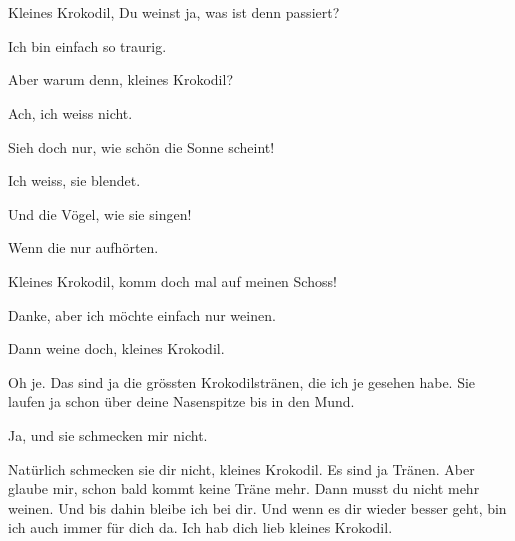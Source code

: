 \chapter*{}

Kleines Krokodil, Du weinst ja, was ist denn passiert?

Ich bin einfach so traurig.

Aber warum denn, kleines Krokodil?

Ach, ich weiss nicht.

Sieh doch nur, wie schön die Sonne scheint!

Ich weiss, sie blendet.

Und die Vögel, wie sie singen!

Wenn die nur aufhörten.

Kleines Krokodil, komm doch mal auf meinen Schoss!

Danke, aber ich möchte einfach nur weinen.

Dann weine doch, kleines Krokodil.



Oh je. Das sind ja die grössten Krokodilstränen, die ich je gesehen habe. Sie laufen ja schon über deine Nasenspitze bis in den Mund.

Ja, und sie schmecken mir nicht.

Natürlich schmecken sie dir nicht, kleines Krokodil. Es sind ja Tränen. Aber glaube mir, schon bald kommt keine Träne mehr. Dann musst du nicht mehr weinen. Und bis dahin bleibe ich bei dir. Und wenn es dir wieder besser geht, bin ich auch immer für dich da. Ich hab dich lieb kleines Krokodil.

